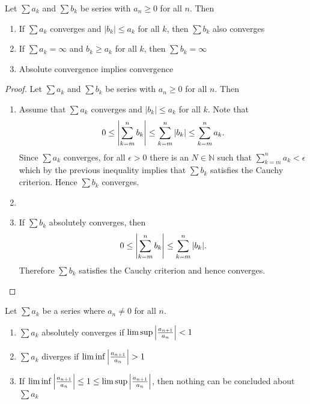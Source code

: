 \documentclass[../notes.tex]{subfiles}
\begin{document}
\begin{theorem}
    Let $\sum a_k$ and $\sum b_k$ be series with $a_n \geq 0$ for all $n$. Then
    \begin{enumerate}
        \item If $\sum a_k$ converges and $|b_k| \leq a_k$ for all $k$, then $\sum b_k$ also converges
        \item If $\sum a_k = \infty$ and $b_k \geq a_k$ for all $k$, then $\sum b_k = \infty$
        \item Absolute convergence implies convergence
    \end{enumerate}
\end{theorem}
\begin{proof}
    Let $\sum a_k$ and $\sum b_k$ be series with $a_n \geq 0$ for all $n$. Then
    \begin{enumerate}
        \item%
        Assume that $\sum a_k$ converges and $|b_k| \leq a_k$ for all $k$. Note that
        \[
            0 \leq \qty|\sum_{k = m}^n b_k| \leq \sum_{k = m}^n |b_k| \leq \sum_{k = m}^n a_k
        .\]
        Since $\sum a_k$ converges, for all $\epsilon > 0$ there is an $N \in \mathbb{N}$ such that $\sum_{k = m}^n a_k < \epsilon$ which by the previous inequality implies that $\sum b_k$ satisfies the Cauchy criterion. Hence $\sum b_k$ converges.
        \item%
        \item%
        If $\sum b_k$ absolutely converges, then
        \[
            0 \leq \qty|\sum_{k = m}^n b_k| \leq \sum_{k = m}^n \qty|b_k|
        .\]
        Therefore $\sum b_k$ satisfies the Cauchy criterion and hence converges.
    \end{enumerate}
\end{proof}

\begin{theorem}
    Let $\sum a_k$ be a series where $a_n \neq 0$ for all $n$.
    \begin{enumerate}
        \item $\sum a_k$ absolutely converges if $\limsup \qty|\frac{a_{n+1}}{a_n}| < 1$
        \item $\sum a_k$ diverges if $\liminf \qty|\frac{a_{n+1}}{a_n}| > 1$
        \item If $\liminf \qty|\frac{a_{n+1}}{a_n}| \leq 1 \leq \limsup \qty|\frac{a_{n+1}}{a_n}|$, then nothing can be concluded about $\sum a_k$
    \end{enumerate}
\end{theorem}
\end{document}
